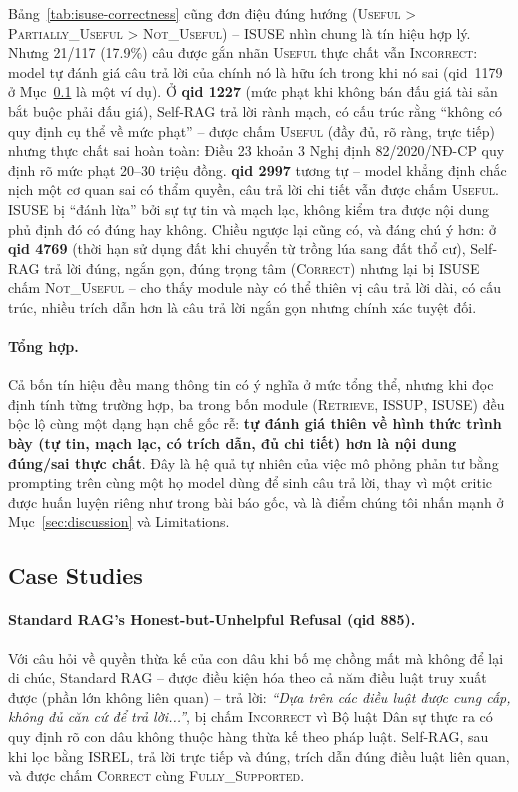 \documentclass[11pt]{article}
\begin{document}
Bảng~\ref{tab:isuse-correctness} cũng đơn điệu đúng hướng (\textsc{Useful} > \textsc{Partially\_Useful} > \textsc{Not\_Useful}) -- \textsc{ISUSE} nhìn chung là tín hiệu hợp lý. Nhưng 21/117 (17.9\%) câu được gắn nhãn \textsc{Useful} thực chất vẫn \textsc{Incorrect}: model tự đánh giá câu trả lời của chính nó là hữu ích trong khi nó sai (qid~1179 ở Mục~\ref{sec:case-studies} là một ví dụ). Ở \textbf{qid 1227} (mức phạt khi không bán đấu giá tài sản bắt buộc phải đấu giá), Self-RAG trả lời rành mạch, có cấu trúc rằng ``không có quy định cụ thể về mức phạt'' -- được chấm \textsc{Useful} (đầy đủ, rõ ràng, trực tiếp) nhưng thực chất sai hoàn toàn: Điều 23 khoản 3 Nghị định 82/2020/NĐ-CP quy định rõ mức phạt 20--30 triệu đồng. \textbf{qid 2997} tương tự -- model khẳng định chắc nịch một cơ quan sai có thẩm quyền, câu trả lời chi tiết vẫn được chấm \textsc{Useful}. \textsc{ISUSE} bị ``đánh lừa'' bởi sự tự tin và mạch lạc, không kiểm tra được nội dung phủ định đó có đúng hay không. Chiều ngược lại cũng có, và đáng chú ý hơn: ở \textbf{qid 4769} (thời hạn sử dụng đất khi chuyển từ trồng lúa sang đất thổ cư), Self-RAG trả lời đúng, ngắn gọn, đúng trọng tâm (\textsc{Correct}) nhưng lại bị \textsc{ISUSE} chấm \textsc{Not\_Useful} -- cho thấy module này có thể thiên vị câu trả lời dài, có cấu trúc, nhiều trích dẫn hơn là câu trả lời ngắn gọn nhưng chính xác tuyệt đối.

\paragraph{Tổng hợp.} Cả bốn tín hiệu đều mang thông tin có ý nghĩa ở mức tổng thể, nhưng khi đọc định tính từng trường hợp, ba trong bốn module (\textsc{Retrieve}, \textsc{ISSUP}, \textsc{ISUSE}) đều bộc lộ cùng một dạng hạn chế gốc rễ: \textbf{tự đánh giá thiên về hình thức trình bày (tự tin, mạch lạc, có trích dẫn, đủ chi tiết) hơn là nội dung đúng/sai thực chất}. Đây là hệ quả tự nhiên của việc mô phỏng phản tư bằng prompting trên cùng một họ model dùng để sinh câu trả lời, thay vì một critic được huấn luyện riêng như trong bài báo gốc, và là điểm chúng tôi nhấn mạnh ở Mục~\ref{sec:discussion} và Limitations.

\subsection{Case Studies}
\label{sec:case-studies}

\paragraph{Standard RAG's Honest-but-Unhelpful Refusal (qid 885).} Với câu hỏi về quyền thừa kế của con dâu khi bố mẹ chồng mất mà không để lại di chúc, Standard RAG -- được điều kiện hóa theo cả năm điều luật truy xuất được (phần lớn không liên quan) -- trả lời: \emph{``Dựa trên các điều luật được cung cấp, không đủ căn cứ để trả lời...''}, bị chấm \textsc{Incorrect} vì Bộ luật Dân sự thực ra có quy định rõ con dâu không thuộc hàng thừa kế theo pháp luật. Self-RAG, sau khi lọc bằng \textsc{ISREL}, trả lời trực tiếp và đúng, trích dẫn đúng điều luật liên quan, và được chấm \textsc{Correct} cùng \textsc{Fully\_Supported}.
\end{document}
